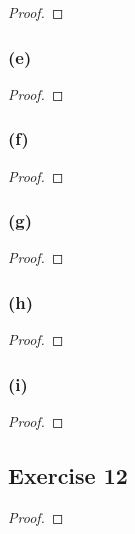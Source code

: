 \documentclass[14pt]{extarticle}
\begin{document}
\begin{proof}

\end{proof}

\subsubsection{(e)}

\begin{proof}

\end{proof}

\subsubsection{(f)}

\begin{proof}

\end{proof}

\subsubsection{(g)}

\begin{proof}

\end{proof}

\subsubsection{(h)}

\begin{proof}

\end{proof}

\subsubsection{(i)}

\begin{proof}

\end{proof}

\subsection{Exercise 12}

\begin{proof}

\end{proof}
\end{document}
